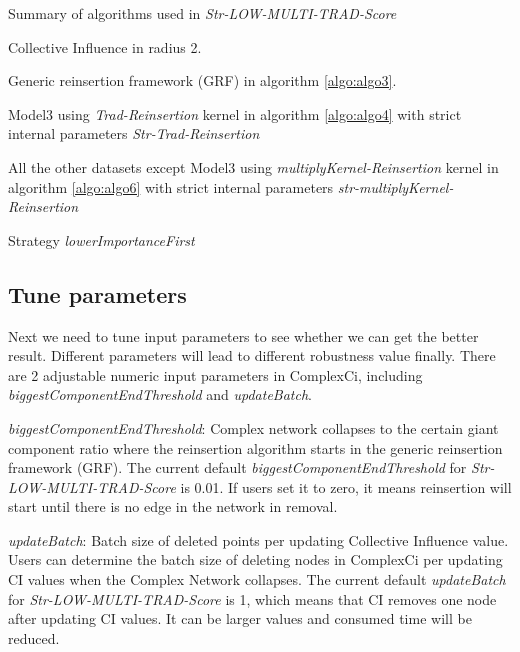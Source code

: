 \documentclass{article}
\begin{document}
		\begin{algorithm}[!htbp]
			\caption{ Summary of algorithms used in \textit{Str-LOW-MULTI-TRAD-Score} }
			\label{algo:algo7}
			\begin{algorithmic}[1]
				\State Collective Influence in radius 2.
				
				\State Generic reinsertion framework (GRF) in algorithm \ref{algo:algo3}.
				
				\State Model3 using \textit{Trad-Reinsertion} kernel in algorithm \ref{algo:algo4} with strict internal parameters \textit{Str-Trad-Reinsertion}
				
				\State All the other datasets except Model3 using \textit{multiplyKernel-Reinsertion} kernel in algorithm \ref{algo:algo6}  with strict internal parameters \textit{str-multiplyKernel-Reinsertion}
				
				\State Strategy \textit{lowerImportanceFirst}
				
				
			\end{algorithmic}
		\end{algorithm}


	 
	 \subsection{Tune parameters}
	 
	 
	 Next we need to tune input parameters to see whether we can get the better result. Different parameters will lead to different robustness value finally. There are 2 adjustable numeric input parameters in ComplexCi, including \textit{biggestComponentEndThreshold} and \textit{updateBatch}. 
	 	 
	\begin{enumerate}
	
		\begin{item}	
			\textit{biggestComponentEndThreshold}: Complex network collapses to the certain giant component ratio where the reinsertion algorithm starts in the generic reinsertion framework (GRF). The current default \textit{biggestComponentEndThreshold} for \textit{Str-LOW-MULTI-TRAD-Score} is 0.01. If users set it to zero, it means reinsertion will start until there is no edge in the network in removal.
		\end{item}
		
		\begin{item}	
			\textit{updateBatch}: Batch size of deleted points per updating Collective Influence value. Users can determine the batch size of deleting nodes in ComplexCi per updating CI values when the Complex Network collapses. The current default \textit{updateBatch} for \textit{Str-LOW-MULTI-TRAD-Score} is 1, which means that CI removes one node after updating CI values. It can be larger values and consumed time will be reduced.
		\end{item}	

	\end{enumerate}	
	 
\end{document}
